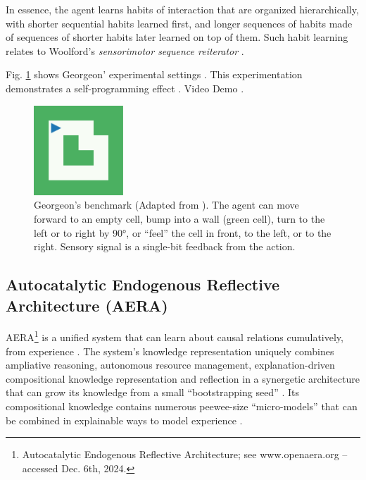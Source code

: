 \documentclass[runningheads]{llncs}
\begin{document}
In essence, the agent learns habits of interaction that are organized hierarchically, with shorter sequential habits learned first, and longer sequences of habits made of sequences of shorter habits later learned on top of them. 
Such habit learning relates to Woolford's \textit{sensorimotor sequence reiterator} \cite{woolford_precarious_2020}.



Fig. \ref{fig:georgeon} shows Georgeon' experimental settings \cite{georgeon_intrinsically-motivated_2012}.
This experimentation demonstrates a self-programming effect \cite{georgeon_cash_2019}.
Video Demo \cite{georgeon_video_2012}.


\begin{figure}
	\centering
	\includegraphics[width=0.3\textwidth]{Figure_grid_plot.pdf}
	\caption{Georgeon's benchmark (Adapted from \cite{georgeon_intrinsically-motivated_2012}).
		The agent can move forward to an empty cell, bump into a wall (green cell), turn to the left or to right by 90°, or ``feel'' the cell in front, to the left, or to the right. 
		Sensory signal is a single-bit feedback from the action. 	
	} 
	\label{fig:georgeon}
\end{figure}


\subsection{Autocatalytic Endogenous Reflective Architecture (AERA)}

AERA\footnote{Autocatalytic Endogenous Reflective Architecture; see www.openaera.org – accessed Dec. 6th, 2024.} is a unified system that can learn about causal relations cumulatively, from experience \cite{thorisson2019cumulative,thorisson2014autonomous,nivel2013autocatalytic}. The system’s knowledge representation uniquely combines ampliative reasoning, autonomous resource management, explanation-driven compositional knowledge representation and reflection in a synergetic architecture that can grow its knowledge from a small “bootstrapping seed” \cite{thorisson2020seed}. Its compositional knowledge contains numerous peewee-size “micro-models” that can be combined in explainable ways to model experience \cite{thorisson2021explanation}. 
\end{document}
